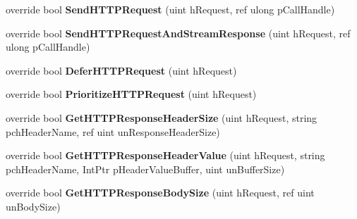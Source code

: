 \begin{DoxyCompactItemize}
\item 
\mbox{\label{class_valve_1_1_steamworks_1_1_c_steam_h_t_t_p_a50e12fb3f3b912def8bb3e17db53b0eb}} 
override bool {\bfseries Send\+H\+T\+T\+P\+Request} (uint h\+Request, ref ulong p\+Call\+Handle)
\item 
\mbox{\label{class_valve_1_1_steamworks_1_1_c_steam_h_t_t_p_a670a6ab2e70e5f2fa7882a75574e7c41}} 
override bool {\bfseries Send\+H\+T\+T\+P\+Request\+And\+Stream\+Response} (uint h\+Request, ref ulong p\+Call\+Handle)
\item 
\mbox{\label{class_valve_1_1_steamworks_1_1_c_steam_h_t_t_p_a818b1c3bdb2c64bdfe1e1214a3d969ec}} 
override bool {\bfseries Defer\+H\+T\+T\+P\+Request} (uint h\+Request)
\item 
\mbox{\label{class_valve_1_1_steamworks_1_1_c_steam_h_t_t_p_ae0bdad8b9352437449c41d03ff2c4b13}} 
override bool {\bfseries Prioritize\+H\+T\+T\+P\+Request} (uint h\+Request)
\item 
\mbox{\label{class_valve_1_1_steamworks_1_1_c_steam_h_t_t_p_a63ab09b6135fc2f93c75bac9447c73ee}} 
override bool {\bfseries Get\+H\+T\+T\+P\+Response\+Header\+Size} (uint h\+Request, string pch\+Header\+Name, ref uint un\+Response\+Header\+Size)
\item 
\mbox{\label{class_valve_1_1_steamworks_1_1_c_steam_h_t_t_p_ae9a11ddda840caf57d105582b2be51b8}} 
override bool {\bfseries Get\+H\+T\+T\+P\+Response\+Header\+Value} (uint h\+Request, string pch\+Header\+Name, Int\+Ptr p\+Header\+Value\+Buffer, uint un\+Buffer\+Size)
\item 
\mbox{\label{class_valve_1_1_steamworks_1_1_c_steam_h_t_t_p_a123672f994b6437b3e71a2e37640ba45}} 
override bool {\bfseries Get\+H\+T\+T\+P\+Response\+Body\+Size} (uint h\+Request, ref uint un\+Body\+Size)
\item 
\mbox{\label{class_valve_1_1_steamworks_1_1_c_steam_h_t_t_p_ae7ff78cb702b1e2b5c923842d201e64b}} 

\end{DoxyCompactItemize}

